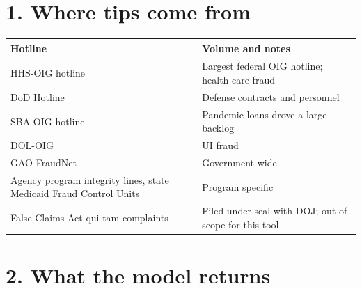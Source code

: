 \documentclass[letterpaper,11pt]{article}
\begin{document}
\hypertarget{where-tips-come-from}{%
\section*{1. Where tips come from}\label{where-tips-come-from}}

\begingroup\small\setlength{\tabcolsep}{4pt}\renewcommand{\arraystretch}{1.25}
\begin{longtable}[l]{@{}>{\raggedright\arraybackslash}p{}>{\raggedright\arraybackslash}p{}@{}}
\rowcolor{coolblack}\leavevmode\color{white}\bfseries Hotline & \leavevmode\color{white}\bfseries Volume and notes \\
\endhead
HHS-OIG hotline & Largest federal OIG hotline; health care fraud \\
DoD Hotline & Defense contracts and personnel \\
SBA OIG hotline & Pandemic loans drove a large backlog \\
DOL-OIG & UI fraud \\
GAO FraudNet & Government-wide \\
Agency program integrity lines, state Medicaid Fraud Control Units & Program specific \\
False Claims Act qui tam complaints & Filed under seal with DOJ; out of scope for this tool \\
\end{longtable}\endgroup

\hypertarget{what-the-model-returns}{%
\section*{2. What the model returns}\label{what-the-model-returns}}
\end{document}
